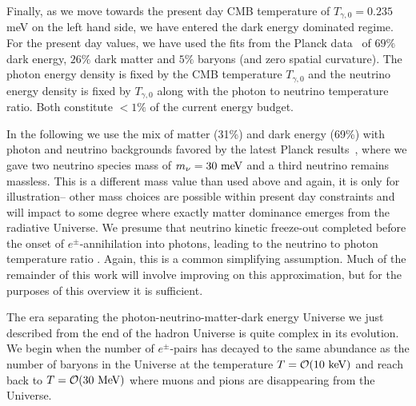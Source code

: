 Finally, as we move towards the present day CMB temperature of $T_{\gamma,0}=0.235$ meV on the left hand side, we have entered the dark energy dominated regime. For the present day values, we have used the fits from the Planck data~\cite{Planck:2018vyg,Planck:2015fie,Planck:2013pxb} of $69\%$ dark energy, $26\%$ dark matter and $5\%$ baryons (and zero spatial curvature). The photon energy density is fixed by the CMB temperature $T_{\gamma,0}$ and the neutrino energy density is fixed by $T_{\gamma,0}$ along with the photon to neutrino temperature ratio. Both constitute $<1\%$ of the current energy budget.

In the following we use the mix of matter (31\%) and dark energy (69\%) with photon and neutrino backgrounds favored by the latest Planck results~\cite{Planck:2018vyg,Planck:2015fie,Planck:2013pxb}, where we gave two neutrino species mass of $m_\nu=30\text{ meV}$ and a third neutrino remains massless. This is a different mass value than used above and again, it is only for illustration-- other mass choices are possible within present day constraints and will impact to some degree where exactly matter dominance emerges from the radiative Universe. We presume that neutrino kinetic freeze-out completed before the onset of $e^\pm$-annihilation into photons, leading to the neutrino to photon temperature ratio . Again, this is a common simplifying assumption. Much of the remainder of this work will involve improving on this approximation, but for the purposes of this overview it is sufficient.

The era separating the photon-neutrino-matter-dark energy Universe we just described from the end of the hadron Universe is quite complex in its evolution. We begin when the number of $e^\pm$-pairs has decayed to the same abundance as the number of baryons in the Universe at the temperature $T=\mathcal{O}(10\text{ keV})$ and reach back to $T={\cal O}(30\MeV)$ where muons and pions are disappearing from the Universe.

